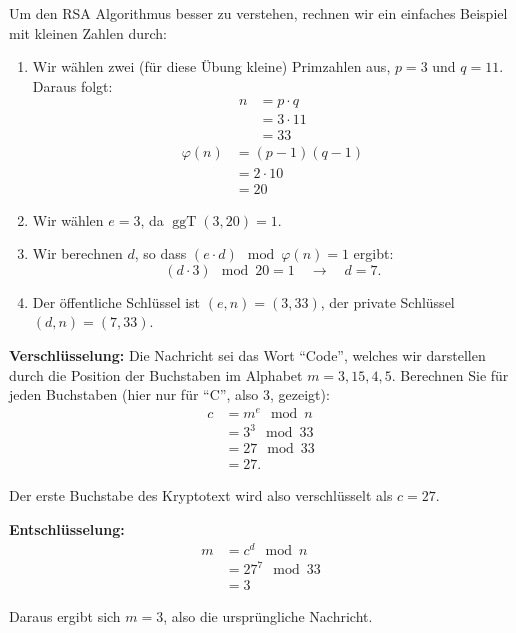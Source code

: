 	\begin{myexample}
		Um den RSA Algorithmus besser zu verstehen, rechnen wir ein einfaches Beispiel mit kleinen Zahlen durch:
		\begin{enumerate}
			\item Wir wählen zwei (für diese Übung kleine) Primzahlen aus, \( p = 3 \) und \( q = 11 \). Daraus folgt:
				\begin{align*}
					n & = p \cdot q  \\
						& = 3 \cdot 11 \\
						& = 33
				\end{align*}
				\begin{align*}
					\varphi(n) & = (p-1)(q-1) \\
								& = 2 \cdot 10 \\
								& = 20
				\end{align*}
			\item Wir wählen \( e = 3 \), da \( \operatorname{ggT}(3, 20) = 1 \).
			\item Wir berechnen \( d \), so dass \( (e \cdot d) \mod \varphi(n) = 1  \) ergibt:
				\[
					(d \cdot 3) \mod 20 = 1  \quad \rightarrow \quad d = 7.
				\]
			\item Der öffentliche Schlüssel ist \( (e, n) = (3, 33) \), der private Schlüssel \( (d, n) = (7, 33) \).
		\end{enumerate}

		\textbf{Verschlüsselung:} Die Nachricht sei das Wort ``Code'', welches wir darstellen durch die Position der Buchstaben im Alphabet \( m = 3, 15, 4, 5 \). Berechnen Sie für jeden Buchstaben (hier nur für ``C'', also 3, gezeigt):
		\begin{align*}
			c & = m^e \mod n  \\
			& = 3^3 \mod 33 \\
			& = 27 \mod 33  \\
			& = 27.
		\end{align*}


		Der erste Buchstabe des Kryptotext wird also verschlüsselt als \( c = 27\).

		\textbf{Entschlüsselung:}
		\begin{align*}
			m & = c^d \mod n     \\
			& = 27^{7} \mod 33 \\
			& = 3
		\end{align*}

		Daraus ergibt sich \( m = 3 \), also die ursprüngliche Nachricht.
	\end{myexample}

